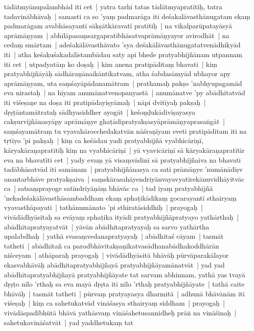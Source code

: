 \documentclass[article,a4paper]{memoir}
\begin{document}
tā\-dā\-tmyā\-nupalambhā\-d iti cet | yatra tarhi tatas tā\-dā\-tmyapratī\-tiḥ, tatra tadavinā\-bhā\-vaḥ | samasti ca so 'yaṃ padmarā\-ga iti deśakalā\-vasthā\-nugatam ekaṃ padmarā\-gam avabhā\-sayantī\- sā\-kṣā\-tkā\-ravatī\- pratī\-tiḥ | \label{thakur75-114.12} na vikalparū\-patayā\-syā\- aprā\-mā\-ṇyam | abhilā\-pasaṃsargapratibhā\-satvaprā\-mā\-ṇyayor avirodhā\-t | \label{thakur75-114.13} na cedaṃ smā\-rtam | adeśakā\-lā\-vasthā\-vato 'sya deśakā\-lā\-vasthā\-nugatatvenā\-dhikyā\-d iti | \label{thakur75-114.15} atha keśakuśakadalī\-stambā\-dau saty api bhede pratyabhijñā\-nam utpannam iti cet | utpadyatā\-ṃ ko doṣaḥ | kim anena pratipā\-ditaṃ bhavati | kiṃ pratyabhijñā\-yā\-ḥ sā\-dhā\-raṇā\-naikā\-ntikatvam, atha śabdasā\-myā\-d ubhayor apy aprā\-mā\-ṇyam, uta saṃśayā\-pā\-danamā\-tram | \label{thakur75-114.18} prathamaḥ pakṣo 'nabhyupagamā\-d eva nirastaḥ | na hī\-yam anumā\-natvenopanyastā\- | anumā\-natve 'py abā\-dhitatvā\-d iti viśeṣaṇe na doṣa iti pratipā\-dayiṣyā\-maḥ | \label{thakur75-114.19} nā\-pi dvitī\-yaḥ pakṣaḥ | dṛṣṭā\-ntamā\-trataḥ sā\-dhyasiddher ayogā\-t | keśoṇḍukā\-diviṣayasya cakṣurvijñā\-nasyā\-py aprā\-mā\-ṇye ghaṭā\-dipratyakṣasyā\-prā\-mā\-ṇyaprasaṅgā\-t | \label{thakur75-114.21} saṃśayamā\-traṃ tu vyavahā\-rocchedakatvā\-n nā\-śraṇī\-yam eveti pratipā\-ditam iti na tṛtī\-yo 'pi pakṣaḥ | \label{thakur75-114.23} kiṃ ca keśā\-dau yadi pratyabhijñā\- vyabhicā\-riṇī\-, kā\-ryakā\-raṇapratī\-tiḥ kiṃ na vyabhicā\-riṇī\- | yā\- vyavicā\-riṇī\- sā\- kā\-ryakā\-raṇapratī\-tir eva na bhavatī\-ti cet | yady evaṃ yā\- visaṃvā\-dinī\- sā\- pratyabhijñaiva na bhavati tadā\-bhā\-satvā\-d iti samā\-nam | pratyabhijñā\-nasya ca sati prā\-mā\-ṇye 'numā\-nā\-diṣv anantarbhā\-ve pratyakṣaiva | saṃskā\-rasahā\-yendriyā\-nvayavyatirekā\-nuvidhā\-yitvā\-c ca | satsaṃprayoge satī\-ndriyā\-ṇā\-ṃ bhā\-vā\-c ca | tad iyaṃ pratyabhijñā\- 'nekadeśakā\-lā\-vasthā\-sambaddham ekaṃ sphaṭikā\-dikaṃ gocarayantī\- sthairyaṃ vyavasthā\-payati | \label{thakur75-114.30} tathā\-numā\-nato 'pi sthiratā\-siddhiḥ | prayogaḥ | vivā\-dā\-dhyā\-sitaḥ sa evā\-yaṃ sphaṭika ityā\-di pratyabhijñā\-pratyayo yathā\-rthaḥ | abā\-dhitapratyayatvā\-t | yā\-vā\-n abā\-dhitapratyayaḥ sa sarvo yathā\-rtha upalabdhaḥ | yathā\- svasaṃvedanapratyayaḥ | abā\-dhitaś cā\-yam | tasmā\-t tatheti | abā\-dhitañ ca parodbhā\-vitakṣaṇikatvasā\-dhanabā\-dhakoddhā\-rā\-n niśceyam | \label{thakur75-115.1} athā\-paraḥ prayogaḥ | vivā\-dā\-dhyā\-sitā\- bhā\-vā\-ḥ pū\-rvā\-parakā\-layor ekasvabhā\-vā\-ḥ abā\-dhitapratyabhijñayā\- pratyabhijñā\-yamā\-natvā\-t | yad yad abā\-dhitapratyabhijñayā\- pratyabhijñā\-yate tat sarvam abhinnam, yathā\- yas tvayā\- dṛṣṭo nī\-lo 'rthaḥ sa eva mayā\- dṛṣta iti nī\-lo 'rthaḥ pratyabhijñā\-yate | tathā\- caite bhā\-vā\-ḥ | tasmā\-t tatheti | pū\-rvaṃ pratyayasya dharmitā\- | adhunā\- bhā\-vā\-nā\-m iti viśeṣaḥ | \label{thakur75-115.6} kiṃ ca sahetukatvā\-d vinā\-śasya sthairyaṃ siddham | prayogaḥ | vivā\-dā\-spadī\-bhū\-tā\- bhā\-vā\- yathā\-svaṃ vinā\-śahetusannidheḥ prā\-ṅ na vinā\-śinaḥ | sahetukavinā\-śatvā\-t | yad yaddhetukaṃ tat 
\end{document}
